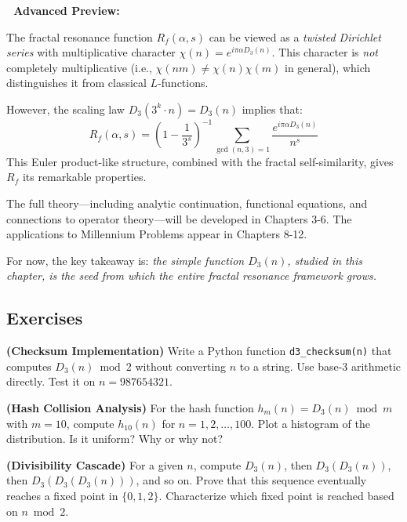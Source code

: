 \textbf{🔴 Advanced Preview:}

The fractal resonance function $R_f(\alpha, s)$ can be viewed as a \textit{twisted Dirichlet series} with multiplicative character $\chi(n) = e^{i\pi\alpha D_3(n)}$. This character is \textit{not} completely multiplicative (i.e., $\chi(nm) \neq \chi(n)\chi(m)$ in general), which distinguishes it from classical $L$-functions.

However, the scaling law $D_3(3^k \cdot n) = D_3(n)$ implies that:
\begin{equation}
R_f(\alpha, s) = \left(1 - \frac{1}{3^s}\right)^{-1} \sum_{\gcd(n,3)=1} \frac{e^{i\pi\alpha D_3(n)}}{n^s}
\end{equation}
This Euler product-like structure, combined with the fractal self-similarity, gives $R_f$ its remarkable properties.

The full theory—including analytic continuation, functional equations, and connections to operator theory—will be developed in Chapters 3-6. The applications to Millennium Problems appear in Chapters 8-12.

For now, the key takeaway is: \textit{the simple function $D_3(n)$, studied in this chapter, is the seed from which the entire fractal resonance framework grows.}

\subsection{Exercises}

\begin{exercise}
\textbf{(Checksum Implementation)} Write a Python function \texttt{d3\_checksum(n)} that computes $D_3(n) \bmod 2$ without converting $n$ to a string. Use base-3 arithmetic directly. Test it on $n = 987654321$.
\end{exercise}

\begin{exercise}
\textbf{(Hash Collision Analysis)} For the hash function $h_m(n) = D_3(n) \bmod m$ with $m = 10$, compute $h_{10}(n)$ for $n = 1, 2, \ldots, 100$. Plot a histogram of the distribution. Is it uniform? Why or why not?
\end{exercise}

\begin{exercise}
\textbf{(Divisibility Cascade)} For a given $n$, compute $D_3(n)$, then $D_3(D_3(n))$, then $D_3(D_3(D_3(n)))$, and so on. Prove that this sequence eventually reaches a fixed point in $\{0, 1, 2\}$. Characterize which fixed point is reached based on $n \bmod 2$.
\end{exercise}

